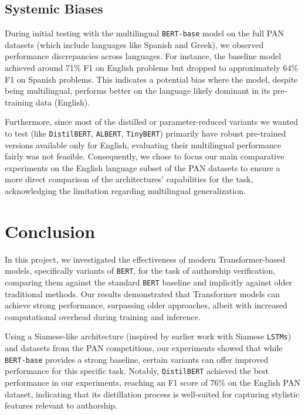 \documentclass[12pt,a4paper]{article}
\begin{document}
\subsection{Systemic Biases}
\label{sec:biases}
During initial testing with the multilingual \texttt{BERT-base} model on the full PAN datasets (which include languages like Spanish and Greek), we observed performance discrepancies across languages. For instance, the baseline model achieved around 71\% F1 on English problems but dropped to approximately 64\% F1 on Spanish problems. This indicates a potential bias where the model, despite being multilingual, performs better on the language likely dominant in its pre-training data (English).

Furthermore, since most of the distilled or parameter-reduced variants we wanted to test (like \texttt{DistilBERT}, \texttt{ALBERT}, \texttt{TinyBERT}) primarily have robust pre-trained versions available only for English, evaluating their multilingual performance fairly was not feasible. Consequently, we chose to focus our main comparative experiments on the English language subset of the PAN datasets to ensure a more direct comparison of the architectures' capabilities for the task, acknowledging the limitation regarding multilingual generalization.

\section{Conclusion}
In this project, we investigated the effectiveness of modern Transformer-based models, specifically variants of \texttt{BERT}, for the task of authorship verification, comparing them against the standard \texttt{BERT} baseline and implicitly against older traditional methods. Our results demonstrated that Transformer models can achieve strong performance, surpassing older approaches, albeit with increased computational overhead during training and inference.

Using a Siamese-like architecture (inspired by earlier work with Siamese \texttt{LSTMs}) and datasets from the PAN competitions, our experiments showed that while \texttt{BERT-base} provides a strong baseline, certain variants can offer improved performance for this specific task. Notably, \texttt{DistilBERT} achieved the best performance in our experiments, reaching an F1 score of 76\% on the English PAN dataset, indicating that its distillation process is well-suited for capturing stylistic features relevant to authorship.
\end{document}
